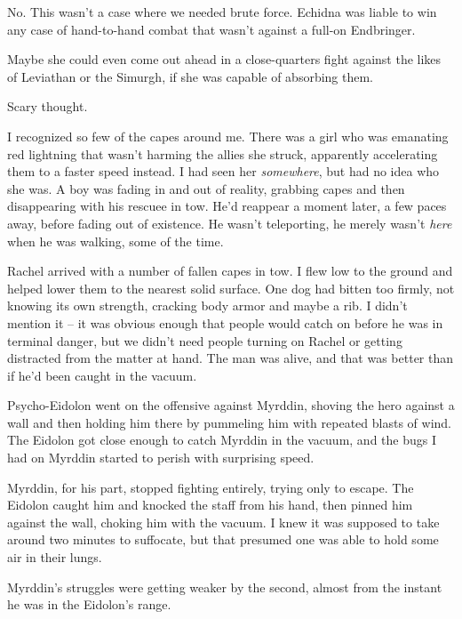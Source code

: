 No.  This wasn't a case where we needed brute force.  Echidna was liable to win any case of hand-to-hand combat that wasn't against a full-on Endbringer.



Maybe she could even come out ahead in a close-quarters fight against the likes of Leviathan or the Simurgh, if she was capable of absorbing them.



Scary thought.



I recognized so few of the capes around me.  There was a girl who was emanating red lightning that wasn't harming the allies she struck, apparently accelerating them to a faster speed instead.  I had seen her \emph{somewhere}, but had no idea who she was.  A boy was fading in and out of reality, grabbing capes and then disappearing with his rescuee in tow.  He'd reappear a moment later, a few paces away, before fading out of existence.  He wasn't teleporting, he merely wasn't \emph{here} when he was walking, some of the time.



Rachel arrived with a number of fallen capes in tow.  I flew low to the ground and helped lower them to the nearest solid surface.  One dog had bitten too firmly, not knowing its own strength, cracking body armor and maybe a rib.  I didn't mention it – it was obvious enough that people would catch on before he was in terminal danger, but we didn't need people turning on Rachel or getting distracted from the matter at hand.  The man was alive, and that was better than if he'd been caught in the vacuum.



Psycho-Eidolon went on the offensive against Myrddin, shoving the hero against a wall and then holding him there by pummeling him with repeated blasts of wind.  The Eidolon got close enough to catch Myrddin in the vacuum, and the bugs I had on Myrddin started to perish with surprising speed.



Myrddin, for his part, stopped fighting entirely, trying only to escape.  The Eidolon caught him and knocked the staff from his hand, then pinned him against the wall, choking him with the vacuum.  I knew it was supposed to take around two minutes to suffocate, but that presumed one was able to hold some air in their lungs.



Myrddin's struggles were getting weaker by the second, almost from the instant he was in the Eidolon's range.



